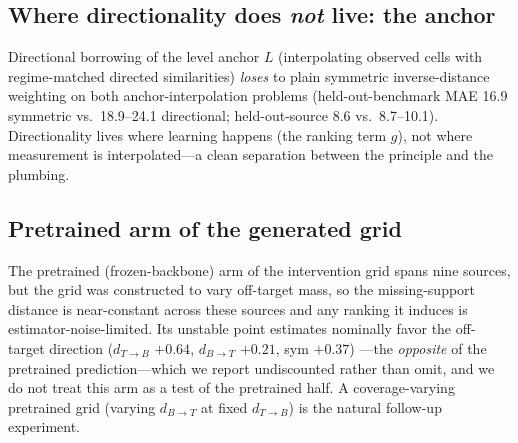 \documentclass[runningheads]{llncs}
\newcommand{\dtb}{d_{T\to B}}
\newcommand{\dbt}{d_{B\to T}}
\begin{document}
\begin{table}[h]
\centering
\caption{Per-regime linear model under different feature sets. MAE is
held-out-source, anchor $+$ model.}
\label{tab:supp_featuresets}
\scriptsize
\setlength{\tabcolsep}{3.5pt}

\end{table}

\subsection{Where directionality does \emph{not} live: the anchor}
Directional borrowing of the level anchor $L$ (interpolating observed cells
with regime-matched directed similarities) \emph{loses} to plain symmetric
inverse-distance weighting on both anchor-interpolation problems
(held-out-benchmark MAE 16.9 symmetric vs.\ 18.9--24.1 directional;
held-out-source 8.6 vs.\ 8.7--10.1). Directionality lives where learning
happens (the ranking term $g$), not where measurement is interpolated---a
clean separation between the principle and the plumbing.

\subsection{Pretrained arm of the generated grid}
The pretrained (frozen-backbone) arm of the intervention grid spans nine
sources, but the grid was constructed to vary off-target mass, so the
missing-support distance is near-constant across these sources and any ranking
it induces is estimator-noise-limited. Its unstable point estimates nominally
favor the off-target direction ($\dtb$ $+0.64$, $\dbt$ $+0.21$, sym $+0.37$)
---the \emph{opposite} of the pretrained prediction---which we report
undiscounted rather than omit, and we do not treat this arm as a test of the
pretrained half. A coverage-varying pretrained grid (varying $\dbt$ at fixed
$\dtb$) is the natural follow-up experiment.
\end{document}
